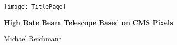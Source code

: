 \begin{frame}
	\begin{center}
		\texttt{[image: TitlePage]}
	\end{center}
	\begin{alertblock}{
		\begin{center}
			\textbf{High Rate Beam Telescope Based on CMS Pixels}
		\end{center}}
		\vspace*{10pt}
		\begin{center}\small
		Michael Reichmann
		\end{center}\normalsize
	\end{alertblock}
\end{frame}
\usebackgroundtemplate{}